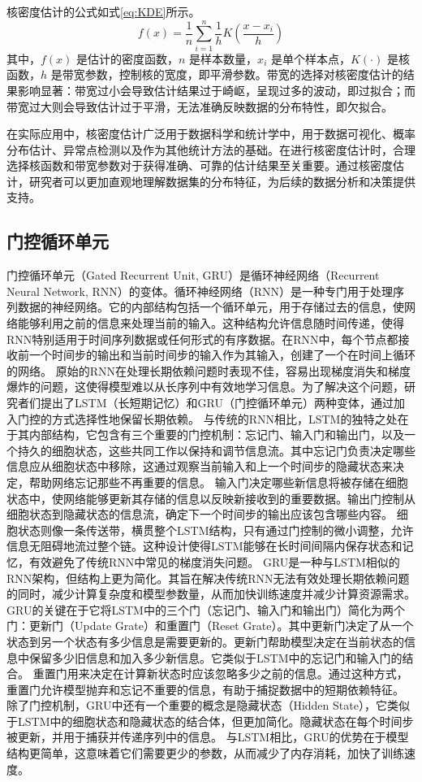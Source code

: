 核密度估计的公式如式\eqref{eq:KDE}所示。
\begin{equation}
    f(x) = \frac{1}{n}\sum_{i=1}^{n} \frac{1}{h}K\left(\frac{x-x_i}{h}\right)
    \label{eq:KDE}
\end{equation}
其中，\(f(x)\) 是估计的密度函数，\(n\) 是样本数量，\(x_i\) 是单个样本点，\(K(\cdot)\) 是核函数，\(h\) 是带宽参数，控制核的宽度，即平滑参数。带宽的选择对核密度估计的结果影响显著：带宽过小会导致估计结果过于崎岖，呈现过多的波动，即过拟合；而带宽过大则会导致估计过于平滑，无法准确反映数据的分布特性，即欠拟合。

在实际应用中，核密度估计广泛用于数据科学和统计学中，用于数据可视化、概率分布估计、异常点检测以及作为其他统计方法的基础。在进行核密度估计时，合理选择核函数和带宽参数对于获得准确、可靠的估计结果至关重要。通过核密度估计，研究者可以更加直观地理解数据集的分布特征，为后续的数据分析和决策提供支持。

\subsection{门控循环单元}
门控循环单元（Gated Recurrent Unit, GRU）是循环神经网络（Recurrent Neural
Network, RNN）的变体。循环神经网络（RNN）是一种专门用于处理序列数据的神经网络。它的内部结构包括一个循环单元，用于存储过去的信息，使网络能够利用之前的信息来处理当前的输入。这种结构允许信息随时间传递，使得RNN特别适用于时间序列数据或任何形式的有序数据。在RNN中，每个节点都接收前一个时间步的输出和当前时间步的输入作为其输入，创建了一个在时间上循环的网络。
原始的RNN在处理长期依赖问题时表现不佳，容易出现梯度消失和梯度爆炸的问题，这使得模型难以从长序列中有效地学习信息。为了解决这个问题，研究者们提出了LSTM（长短期记忆）和GRU（门控循环单元）两种变体，通过加入门控的方式选择性地保留长期依赖。
与传统的RNN相比，LSTM的独特之处在于其内部结构，它包含有三个重要的门控机制：忘记门、输入门和输出门，以及一个持久的细胞状态，这些共同工作以保持和调节信息流。其中忘记门负责决定哪些信息应从细胞状态中移除，这通过观察当前输入和上一个时间步的隐藏状态来决定，帮助网络忘记那些不再重要的信息。
输入门决定哪些新信息将被存储在细胞状态中，使网络能够更新其存储的信息以反映新接收到的重要数据。输出门控制从细胞状态到隐藏状态的信息流，确定下一个时间步的输出应该包含哪些内容。
细胞状态则像一条传送带，横贯整个LSTM结构，只有通过门控制的微小调整，允许信息无阻碍地流过整个链。这种设计使得LSTM能够在长时间间隔内保存状态和记忆，有效避免了传统RNN中常见的梯度消失问题。
GRU是一种与LSTM相似的RNN架构，但结构上更为简化。其旨在解决传统RNN无法有效处理长期依赖问题的同时，减少计算复杂度和模型参数量，从而加快训练速度并减少计算资源需求。
GRU的关键在于它将LSTM中的三个门（忘记门、输入门和输出门）简化为两个门：更新门（Update Grate）和重置门（Reset Grate）。其中更新门决定了从一个状态到另一个状态有多少信息是需要更新的。更新门帮助模型决定在当前状态的信息中保留多少旧信息和加入多少新信息。它类似于LSTM中的忘记门和输入门的结合。
重置门用来决定在计算新状态时应该忽略多少之前的信息。通过这种方式，重置门允许模型抛弃和忘记不重要的信息，有助于捕捉数据中的短期依赖特征。
除了门控机制，GRU中还有一个重要的概念是隐藏状态（Hidden State），它类似于LSTM中的细胞状态和隐藏状态的结合体，但更加简化。隐藏状态在每个时间步被更新，并用于捕获并传递序列中的信息。
与LSTM相比，GRU的优势在于模型结构更简单，这意味着它们需要更少的参数，从而减少了内存消耗，加快了训练速度。
